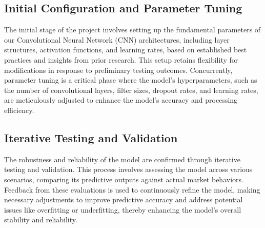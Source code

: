 \thesisspacing %

\subsection{Initial Configuration and Parameter Tuning}
The initial stage of the project involves setting up the fundamental parameters of our Convolutional Neural Network (CNN) architectures, including layer structures, activation functions, and learning rates, based on established best practices and insights from prior research. This setup retains flexibility for modifications in response to preliminary testing outcomes. Concurrently, parameter tuning is a critical phase where the model's hyperparameters, such as the number of convolutional layers, filter sizes, dropout rates, and learning rates, are meticulously adjusted to enhance the model’s accuracy and processing efficiency.

\subsection{Iterative Testing and Validation}
The robustness and reliability of the model are confirmed through iterative testing and validation. This process involves assessing the model across various scenarios, comparing its predictive outputs against actual market behaviors. Feedback from these evaluations is used to continuously refine the model, making necessary adjustments to improve predictive accuracy and address potential issues like overfitting or underfitting, thereby enhancing the model's overall stability and reliability.
